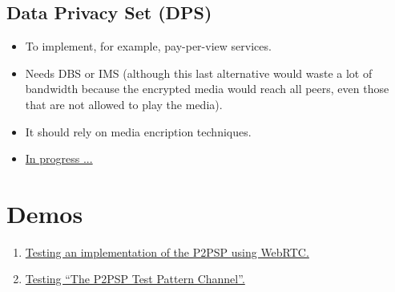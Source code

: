 \documentclass{article}
\begin{document}

\subsection{Data Privacy Set (DPS)}

\begin{itemize}
\item To implement, for example, pay-per-view services.
\item Needs DBS or IMS (although this last alternative would waste a
  lot of bandwidth because the encrypted media would reach all peers,
  even those that are not allowed to play the media).
\item It should rely on media encription techniques.
\item
  \href{http://www.p2psp.org/en/p2psp-protocol?cap=indexsu16.xht#x25-210004.16}{In
    progress ...}
\end{itemize}



\section*{Demos}

\begin{enumerate}
\item \href{https://www.youtube.com/watch?v=R7035-XaZd4}{Testing an implementation of the P2PSP using WebRTC.}

\ifx \HCode\Undfef
\else
{}
\fi


\item \href{https://www.youtube.com/watch?v=sB3u9U49woM}{Testing ``The P2PSP Test Pattern Channel''.}

\ifx \HCode\Undfef
\else
{}
\fi
\end{enumerate}
\end{document}
